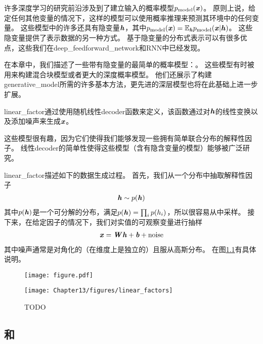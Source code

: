 \chapter{}
\label{chap:linear_factor_models}




许多深度学习的研究前沿涉及到了建立输入的概率模型$p_{\text{model}}(\boldsymbol{\mathit{x}})$。
原则上说，给定任何其他变量的情况下，这样的模型可以使用概率推理来预测其环境中的任何变量。
这些模型中的许多还具有隐变量$\boldsymbol{\mathit{h}}$，其中$p_{\text{model}}(\boldsymbol{\mathit{x}}) = \mathbb{E}_{\boldsymbol{\mathit{h}}} p_{\text{model}}(\boldsymbol{\mathit{x}}\vert\boldsymbol{\mathit{h}})$。
这些隐变量提供了表示数据的另一种方式。
 基于隐变量的分布式表示可以有很多优点，这些我们在\gls{deep_feedforward_network}和\gls{RNN}中已经发现。


在本章中，我们描述了一些带有隐变量的最简单的概率模型：。
这些模型有时被用来构建混合块模型\citep{Hinton-nips95,ghahramani96em,Roweis+Saul+Hinton-2002}或者更大的深度概率模型\citep{tang2012deep}。
他们还展示了构建\gls{generative_model}所需的许多基本方法，更先进的深层模型也将在此基础上进一步扩展。


\gls{linear_factor}通过使用随机线性\gls{decoder}函数来定义，该函数通过对$\boldsymbol{\mathit{h}}$的线性变换以及添加噪声来生成$\boldsymbol{\mathit{x}}$。


这些模型很有趣，因为它们使得我们能够发现一些拥有简单联合分布的解释性因子。 
线性\gls{decoder}的简单性使得这些模型（含有隐含变量的模型）能够被广泛研究。


\gls{linear_factor}描述如下的数据生成过程。 
首先，我们从一个分布中抽取解释性因子
\begin{align}
\label{eqn:131}
\boldsymbol{\mathit{h}} \sim p(\boldsymbol{\mathit{h}})
\end{align}
其中$p(\boldsymbol{\mathit{h}})$是一个可分解的分布，满足$p(\boldsymbol{\mathit{h}}) = \prod_{i}^{}p(h_i)$，所以很容易从中采样。
接下来，在给定因子的情况下，我们对实值的可观察变量进行抽样
\begin{align}
\label{eqn:132}
\boldsymbol{\mathit{x}} = \boldsymbol{\mathit{W}} \boldsymbol{\mathit{h}} + \boldsymbol{\mathit{b}} + \text{noise}
\end{align}
其中噪声通常是对角化的（在维度上是独立的）且服从高斯分布。
在图\ref{fig:linear_factors}有具体说明。

\begin{figure}[!htb]
\ifOpenSource
\centerline{\texttt{[image: figure.pdf]}}
\else
	\centerline{\texttt{[image: Chapter13/figures/linear\_factors]}}
\fi
	\caption{TODO}
	\label{fig:linear_factors}
\end{figure}


\section{和}
\label{sec:probabilistic_PCA_and_factor_analysis}

